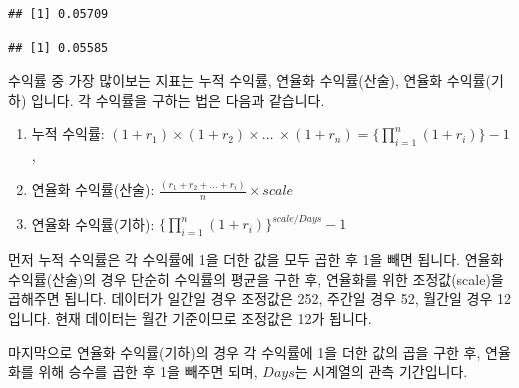 \documentclass[12pt,]{book}
\newenvironment{Shaded}{\begin{snugshade}}{\end{snugshade}}
\newcommand{\CommentTok}[1]{\textcolor[rgb]{0.56,0.35,0.01}{\textit{#1}}}
\newcommand{\DecValTok}[1]{\textcolor[rgb]{0.00,0.00,0.81}{#1}}
\newcommand{\KeywordTok}[1]{\textcolor[rgb]{0.13,0.29,0.53}{\textbf{#1}}}
\newcommand{\NormalTok}[1]{#1}
\newcommand{\OperatorTok}[1]{\textcolor[rgb]{0.81,0.36,0.00}{\textbf{#1}}}
\newcommand{\StringTok}[1]{\textcolor[rgb]{0.31,0.60,0.02}{#1}}
\providecommand{\tightlist}{%
  \setlength{\itemsep}{0pt}\setlength{\parskip}{0pt}}
\begin{document}
\begin{verbatim}
## [1] 0.05709
\end{verbatim}

\begin{Shaded}
\end{Shaded}

\begin{verbatim}
## [1] 0.05585
\end{verbatim}

수익률 중 가장 많이보는 지표는 누적 수익률, 연율화 수익률(산술), 연율화 수익률(기하) 입니다. 각 수익률을 구하는 법은 다음과 같습니다.

\begin{enumerate}
\def\labelenumi{\arabic{enumi}.}
\tightlist
\item
  누적 수익률: \((1+r_1) \times (1+r_2) \times \dots \ \times (1+r_n) = \{\prod_{i=1}^n(1+r_i)\}-1\),
\item
  연율화 수익률(산술): \(\frac{(r_1 + r_2 + \dots + r_i)}{n} \times scale\)
\item
  연율화 수익률(기하): \(\{\prod_{i=1}^n(1+r_i)\}^{scale / Days} - 1\)
\end{enumerate}

먼저 누적 수익률은 각 수익률에 1을 더한 값을 모두 곱한 후 1을 빼면 됩니다. 연율화 수익률(산술)의 경우 단순히 수익률의 평균을 구한 후, 연율화를 위한 조정값(scale)을 곱해주면 됩니다. 데이터가 일간일 경우 조정값은 252, 주간일 경우 52, 월간일 경우 12 입니다. 현재 데이터는 월간 기준이므로 조정값은 12가 됩니다.

마지막으로 연율화 수익률(기하)의 경우 각 수익률에 1을 더한 값의 곱을 구한 후, 연율화를 위해 승수를 곱한 후 1을 빼주면 되며, \(Days\)는 시계열의 관측 기간입니다.

\begin{Shaded}
\end{Shaded}
\end{document}
